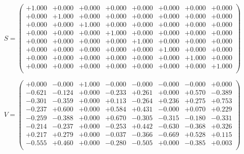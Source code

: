 \documentclass[9pt]{article}
\theoremstyle{plain}
\theoremstyle{definition}
\theoremstyle{remark}
\numberwithin{equation}{section}
\begin{document}
$S = \left(
\begin{array}{
cccccccc}
+1.000 & +0.000 & +0.000 & +0.000 & +0.000 & +0.000 & +0.000 & +0.000 \\
+0.000 & +1.000 & +0.000 & +0.000 & +0.000 & +0.000 & +0.000 & +0.000 \\
+0.000 & +0.000 & +1.000 & +0.000 & +0.000 & +0.000 & +0.000 & +0.000 \\
+0.000 & +0.000 & +0.000 & +1.000 & +0.000 & +0.000 & +0.000 & +0.000 \\
+0.000 & +0.000 & +0.000 & +0.000 & +1.000 & +0.000 & +0.000 & +0.000 \\
+0.000 & +0.000 & +0.000 & +0.000 & +0.000 & +1.000 & +0.000 & +0.000 \\
+0.000 & +0.000 & +0.000 & +0.000 & +0.000 & +0.000 & +1.000 & +0.000 \\
+0.000 & +0.000 & +0.000 & +0.000 & +0.000 & +0.000 & +0.000 & +1.000 \\
\end{array}
\right)$ \newline 

$V = \left(
\begin{array}{
cccccccc}
+0.000 & -0.000 & +1.000 & -0.000 & -0.000 & -0.000 & -0.000 & +0.000 \\
-0.621 & -0.124 & +0.000 & -0.233 & +0.261 & +0.000 & +0.570 & -0.389 \\
-0.301 & -0.359 & +0.000 & +0.113 & -0.264 & +0.236 & +0.275 & +0.753 \\
-0.237 & +0.600 & +0.000 & +0.584 & +0.431 & -0.000 & +0.070 & +0.229 \\
-0.259 & -0.388 & +0.000 & +0.670 & -0.305 & -0.315 & -0.180 & -0.331 \\
-0.214 & -0.237 & +0.000 & -0.253 & +0.442 & -0.630 & -0.368 & +0.326 \\
+0.217 & +0.279 & +0.000 & -0.037 & -0.366 & -0.669 & +0.528 & +0.115 \\
-0.555 & +0.460 & +0.000 & -0.280 & -0.505 & +0.000 & -0.385 & +0.003 \\
\end{array}
\right)$ \newline 
\end{document}
